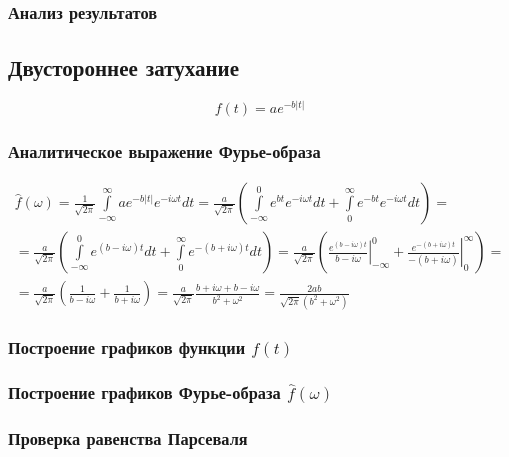 \documentclass[a5paper, 10pt]{article}
\theoremstyle{definition}
\theoremstyle{plain}
\theoremstyle{remark}
\begin{document}
\subsubsection{Анализ результатов}




\newpage
\subsection{Двустороннее затухание}

\begin{equation}
f(t) = a e^{-b|t|}
\end{equation}


\subsubsection{Аналитическое выражение Фурье-образа}

\begin{multline}
\hat{f}(\omega) =
 \frac{1}{\sqrt{2 \pi}} \int \limits_{-\infty}^{\infty} a e^{-b|t|} e^{-i \omega t} dt =  \frac{a}{\sqrt{2 \pi}}  \left( \int \limits_{-\infty}^{0} e^{b t} e^{-i \omega t} dt  + \int \limits_{0}^{\infty} e^{-b t} e^{-i \omega t} dt  \right) = \\
=  \frac{a}{\sqrt{2 \pi}}  \left( \int \limits_{-\infty}^{0} e^{(b-i \omega) t} dt  + \int \limits_{0}^{\infty}e^{-(b + i \omega) t} dt  \right) 
= \frac{a}{\sqrt{2 \pi}}  \left(  \left. \frac{e^{(b-i \omega) t}}{b-i \omega} \right|_{-\infty}^{0} + \left. \frac{e^{-(b + i \omega) t}}{-(b + i \omega)} \right|_{0}^{\infty}  \right) =\\
=\frac{a}{\sqrt{2 \pi}}  \left( \frac{1}{b-i \omega} + \frac{1}{b + i \omega}  \right) =
\frac{a}{\sqrt{2 \pi}}   \frac{b + i \omega +b - i \omega}{b^2 + \omega^2} = \frac{2ab}{\sqrt{2 \pi} (b^2 + \omega^2)}
\end{multline}

\subsubsection{Построение графиков функции $f(t)$}




\subsubsection{Построение графиков Фурье-образа $\hat{f} (\omega)$}



\subsubsection{Проверка равенства Парсеваля}
\end{document}

